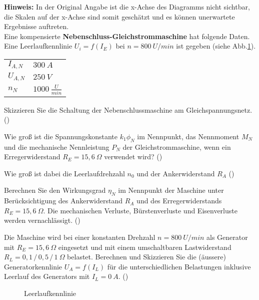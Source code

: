 \begin{question}[section=2,name={14.10.2015},mode=exm,type=bsp,tags={20151014}]
\textbf{Hinweis:} In der Original Angabe ist die x-Achse des Diagramms nicht sichtbar, die Skalen auf der x-Achse sind somit geschätzt und es können unerwartete Ergebnisse auftreten.\\
Eine kompensierte \textbf{Nebenschluss-Gleichstrommaschine} hat folgende Daten. Eine Leerlaufkennlinie $U_i=f(I_E)$ bei $n=800~U/min$ ist gegeben (siehe Abb.\ref{fig:20151014}).\\
\begin{tabular}{L{2cm}l}
$I_{A,N}$ \dotfill &$300~A$\\
$U_{A,N}$ \dotfill & $250~V$ \\
$n_N$ \dotfill & $1000~\frac{U}{min}$
\end{tabular}
\begin{compactenum}
\item Skizzieren Sie die Schaltung der Nebenschlussmaschine am Gleichspannungsnetz. ()
\item Wie groß ist die Spannungskonstante $k_1 \phi_N$ im Nennpunkt, das Nennmoment $M_N$ und die mechanische Nennleistung $P_N$ der Gleichstrommaschine, wenn ein Erregerwiderstand $R_E=15,6~\Omega$ verwendet wird? ()
\item Wie groß ist dabei die Leerlaufdrehzahl $n_0$ und der Ankerwiderstand $R_A$ ()
\item Berechnen Sie den Wirkungsgrad $\eta_N$ im Nennpunkt der Maschine unter Berücksichtigung des Ankerwiderstand $R_A$ und des Erregerwiderstands $R_E = 15,6~\Omega$. Die mechanischen Verluste, Bürstenverluste und Eisenverluste werden vernachlässigt. ()
\item Die Maschine wird bei einer konstanten Drehzahl $n=800~U/min$ als Generator mit $R_E =15,6~\Omega$ eingesetzt und mit einem umschaltbaren Lastwiderstand $R_L = 0,1\, /\, 0,5\, /\, 1 ~\Omega$ belastet. Berechnen und Skizzieren Sie die (äussere) Generatorkennlinie $U_A=f(I_L)$ für die unterschiedlichen Belastungen inklusive Leerlauf des Generators mit $I_L = 0~A$. ()
\end{compactenum}
\begin{figure}[H]
\caption{Leerlaufkennlinie} \label{fig:20151014}
\end{figure}
\end{question}
